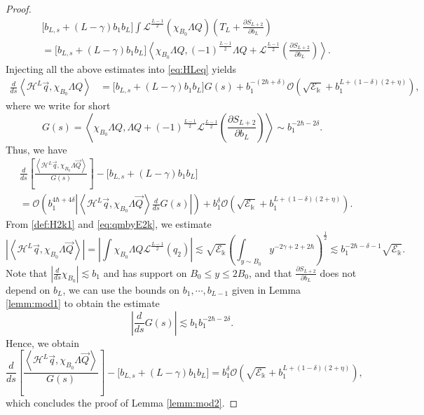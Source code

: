 \documentclass[11pt]{aims}
\theoremstyle{definition}
\numberwithin{equation}{section}
\begin{document}
\begin{proof}
\begin{align*}
&\big[b_{L,s}+ (L - \gamma)b_1b_L\big]\int {\mathscr{L}}^{\frac{L-1}{2}}(\chi_{B_0}\Lambda Q)\left(T_L + \frac{\partial S_{L +2}}{\partial b_L}\right)\\
& = \big[b_{L,s}+ (L - \gamma)b_1b_L\big]\left<\chi_{B_0}\Lambda Q, (-1)^{\frac{L-1}{2}}\Lambda Q + {\mathscr{L}}^{\frac{L-1}2}\left(\frac{\partial S_{L +2}}{\partial b_L}\right) \right>.
\end{align*}
Injecting all the above estimates into \eqref{eq:HLeq} yields
\begin{align*}
\frac{d}{ds}\left<{\mathscr{H}}^L \vec q, \chi_{B_0}\Lambda Q\right> &= \big[b_{L,s} + (L -\gamma)b_1b_L\big]G(s) + b_1^{-(2\hbar + \delta)}{\mathcal{O}}\left(\sqrt{{\mathscr{E}}_{\Bbbk}} + b_1^{L + (1 - \delta)(2 + \eta)}\right),
\end{align*}
where we write for short
\begin{equation}\label{def:Gs}
G(s) = \left<\chi_{B_0}\Lambda Q,\Lambda Q  +  (-1)^{\frac{L - 1}2} {\mathscr{L}}^{\frac{L-1}2}\left(\frac{\partial S_{L+2}}{\partial b_L} \right)\right> \sim b_1^{-2\hbar - 2\delta}.
\end{equation}
Thus, we have
\begin{align*}
&\frac{d}{ds} \left[ \frac{\left<{\mathscr{H}}^L \vec q, \chi_{B_0}\Lambda \vec Q\right>}{G(s)}\right] - \big[b_{L,s} + (L -\gamma)b_1b_L\big]\\
& ={\mathcal{O}}\left( b_1^{4\hbar + 4\delta}\left|\left<{\mathscr{H}}^L \vec q, \chi_{B_0}\Lambda \vec Q\right> \frac{d}{ds}G(s)\right|\right) +  b_1^\delta {\mathcal{O}}\left(\sqrt{{\mathscr{E}}_{\Bbbk}} + b_1^{L + (1 - \delta)(2 + \eta)}\right).
\end{align*}
From \eqref{def:H2k1} and \eqref{eq:qmbyE2k}, we estimate 
\begin{equation}\label{eq:HsLchiB0}
\left|\left<{\mathscr{H}}^L \vec q, \chi_{B_0}\Lambda \vec Q\right> \right| = \left|\int\chi_{B_0}\Lambda Q {\mathscr{L}}^{\frac{L-1}2}(q_2)\right| \lesssim \sqrt{{\mathscr{E}}_\Bbbk}\left(\int_{y \sim B_0}y^{-2\gamma + 2 + 2\hbar} \right)^\frac{1}{2} \lesssim b_1^{-2\hbar -\delta - 1}\sqrt{{\mathscr{E}}_\Bbbk}.
\end{equation}
Note that $\left|\frac{d}{ds}\chi_{B_0}\right| \lesssim b_1$ and has support on $B_0 \leq y \leq 2B_0$, and that $\frac{\partial S_{L+2}}{\partial b_L}$ does not depend on $b_L$, we can use the bounds on $b_1, \cdots, b_{L-1}$ given in Lemma \ref{lemm:mod1} to obtain the estimate
$$\left|\frac{d}{ds}G(s)\right| \lesssim b_1b_1^{-2\hbar -2\delta}.$$
Hence, we obtain 
$$\frac{d}{ds} \left[ \frac{\left<{\mathscr{H}}^L \vec q, \chi_{B_0}\Lambda \vec Q\right>}{G(s)}\right] - \big[b_{L,s} + (L -\gamma)b_1b_L\big] = b_1^\delta {\mathcal{O}}\left(\sqrt{{\mathscr{E}}_{\Bbbk}} + b_1^{L + (1 - \delta)(2 + \eta)}\right),$$
which concludes the proof of Lemma \ref{lemm:mod2}.
\end{proof}
\end{document}

